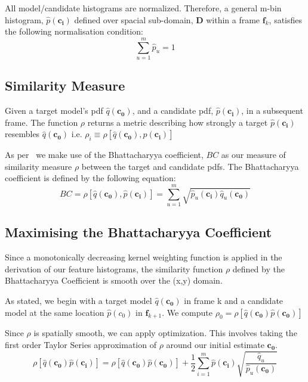 All model/candidate histograms are normalized. Therefore, a general m-bin
histogram, $\hat{p}(\mathbf{c_i})$ defined over spacial sub-domain, $\mathbf{D}$
within a frame $\mathbf{f}_k$, satisfies the following normalisation condition:
\[\sum_{u=1}^{m}\hat{p}_u = 1\]

\subsection{Similarity Measure}
Given a target model's pdf $\hat{q}(\mathbf{c_0})$, and a candidate pdf,
$\hat{p}(\mathbf{c_i})$, in a subsequent frame.  The function $\rho$ returns a
metric describing how strongly a target $\hat{p}(\mathbf{c_i})$ resembles
$\hat{q}(\mathbf{c_0})$ i.e.
$\rho_i \equiv \rho[\hat{q}(\mathbf{c_0}),\hat{p}(\mathbf{c_i})]$


As per~\cite{Comaniciu2003} we make use of the Bhattacharyya coefficient, $BC$ as our
measure of similarity measure $\rho$ between the target and candidate pdfs. The
Bhattacharyya coefficient is defined by the following equation:
\begin{equation}\label{eqn:bhattacharyya}
    BC = \rho[\hat{q}(\mathbf{c_0}),\hat{p}(\mathbf{c_i})]=\sum_{u=1}^{m}\sqrt{\hat{p}_u(\mathbf{c_i})\hat{q}_u(\mathbf{c_0})}
\end{equation}

\subsection{Maximising the Bhattacharyya Coefficient}\label{maximising_bhat}
Since a monotonically decreasing kernel weighting function is applied in the
derivation of our feature histograms, the similarity function $\rho$ defined by the
Bhattacharyya Coefficient is smooth over the (x,y) domain.

As stated, we begin with a target model $\hat{q}(\mathbf{c_0})$ in frame k and a candidate
model at the same location $\hat{p}(c_0)$ in $\mathbf{f}_{k+1}$. We compute
$\rho_0=\rho[\hat{q}(\mathbf{c_0})\hat{p}(\mathbf{c_0})]$ 

Since $\rho$ is spatially smooth, we can apply optimization. This involves
taking the first order Taylor Series approximation of $\rho$ around our initial
estimate $\mathbf{c_0}$. 
\begin{equation}\label{eqn:rho_taylor}
    \rho[\hat{q}(\mathbf{c_0})\hat{p}(\mathbf{c_i})]=\rho[\hat{q}(\mathbf{c_0})\hat{p}(\mathbf{c_0})]+\frac{1}{2}\sum_{i=1}^{m}\hat{p}(\mathbf{c_i})\sqrt{\frac{\hat{q}_u}{\hat{p}_u(\mathbf{c_0})}}
\end{equation}


